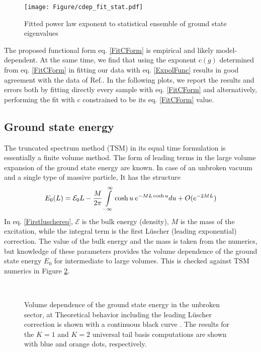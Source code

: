 \documentclass[twocolumn,secnumarabic,amssymb, nobibnotes, aps, prd]{revtex4-2}
\newcommand{\be}{\begin{equation}}
\newcommand{\ee}{\end{equation}}
\begin{document}
\begin{figure}[h]
    \centering
     \texttt{[image: Figure/cdep\_fit\_stat.pdf]}

    \caption{Fitted power law exponent to statistical ensemble of ground state eigenvalues}
    \label{FigFitStat}
\end{figure}

The proposed functional form eq. \eqref{FitCForm} is empirical and likely model-dependent. At the same time, we find that using the exponent $c(g)$ determined from eq. \eqref{FitCForm} in fitting our data with eq. \eqref{ExpolFunc} results in good agreement with the data of Ref.\cite{Elias-Miro:2017tup}.
In the following plots, we report the results and errors both by fitting directly every sample with eq. \eqref{FitCForm} and alternatively, performing the fit with $c$ constrained to be its eq. \eqref{FitCForm} value.

\subsection{Ground state energy}
The truncated spectrum method (TSM) in its equal time formulation is essentially a finite volume method. The form of leading terms in the large volume expansion of the ground state energy are known. In case of an unbroken vacuum and a single type of massive particle, It has the structure
\be
E_0(L)=\mathcal{E}_0 L-\frac{M}{2\pi}\intop_{-\infty}^\infty \cosh u\: e^{-ML\cosh u}du + O(e^{-2ML}) \label{Firstluschereq}
\ee
In eq. \eqref{Firstluschereq}, $\mathcal{E}$ is the bulk energy (density), $M$ is the mass of the excitation, while the integral term is the first Lüscher (leading exponential) correction. The value of the bulk energy and the mass is taken from the numerics, but knowledge of these parameters provides the volume dependence of the ground state energy $E_0$ for intermediate to large volumes. This is checked against TSM numerics in Figure \ref{FigVoldep}. 

\begin{figure}[h]
    \centering
 \\

    \caption{Volume dependence of the ground state energy in the unbroken sector, at Theoretical behavior including the leading Lüscher correction is shown with a continuous black curve . The results for the $K=1$ and $K=2$ universal tail basis computations are shown with blue and orange dots, respectively.}
    \label{FigVoldep}
\end{figure}
\end{document}
